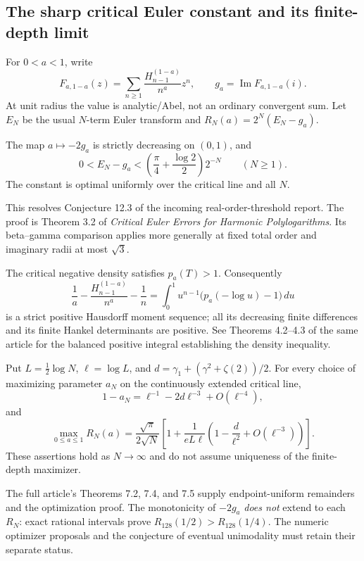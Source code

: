 \subsection{The sharp critical Euler constant and its finite-depth limit}
\label{criticaleuler:section}
For $0<a<1$, write
\[
 F_{a,1-a}(z)=\sum_{n\ge1}\frac{H_{n-1}^{(1-a)}}{n^a}z^n,
 \qquad g_a=\operatorname{Im}F_{a,1-a}(i).
\]
At unit radius the value is analytic/Abel, not an ordinary convergent sum.
Let $E_N$ be the usual $N$-term Euler transform and
$R_N(a)=2^N(E_N-g_a)$.

\begin{theorem}
\label{criticaleuler:constant}
The map $a\mapsto-2g_a$ is strictly decreasing on $(0,1)$, and
\[
 0<E_N-g_a<\left(\frac\pi4+\frac{\log2}{2}\right)2^{-N}
 \qquad(N\ge1).
\]
The constant is optimal uniformly over the critical line and all $N$.
\end{theorem}
This resolves Conjecture 12.3 of the incoming real-order-threshold report.
The proof is Theorem 3.2 of \emph{Critical Euler Errors for Harmonic
Polylogarithms}. Its beta--gamma comparison applies more generally at
fixed total order and imaginary radii at most $\sqrt3$.

The critical negative density satisfies $p_a(T)>1$. Consequently
\[
 \frac1a-\frac{H_{n-1}^{(1-a)}}{n^a}-\frac1n
 =\int_0^1u^{n-1}\bigl(p_a(-\log u)-1\bigr)\,du
\]
is a strict positive Hausdorff moment sequence; all its decreasing
finite differences and its finite Hankel determinants are positive.
See Theorems 4.2--4.3 of the same article for the balanced positive
integral establishing the density inequality.

\begin{theorem}
\label{criticaleuler:drift}
Put $L=\tfrac12\log N$, $\ell=\log L$, and
$d=\gamma_1+(\gamma^2+\zeta(2))/2$. For every choice of maximizing
parameter $a_N$ on the continuously extended critical line,
\[
 1-a_N=\ell^{-1}-2d\ell^{-3}+O(\ell^{-4}),
\]
and
\[
 \max_{0\le a\le1}R_N(a)
 =\frac{\sqrt\pi}{2\sqrt N}
 \left[1+\frac1{eL\ell}
 \left(1-\frac d{\ell^2}+O(\ell^{-3})\right)\right].
\]
These assertions hold as $N\to\infty$ and do not assume uniqueness
of the finite-depth maximizer.
\end{theorem}
The full article's Theorems 7.2, 7.4, and 7.5 supply endpoint-uniform
remainders and the optimization proof. The monotonicity of $-2g_a$
\emph{does not} extend to each $R_N$: exact rational intervals prove
$R_{128}(1/2)>R_{128}(1/4)$. The numeric optimizer proposals and the
conjecture of eventual unimodality must retain their separate status.
